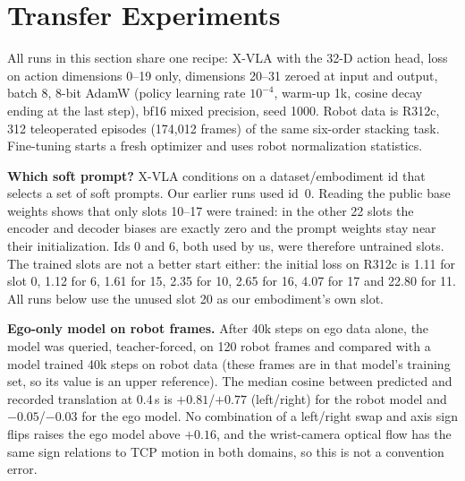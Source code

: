 \documentclass[conference,10pt]{IEEEtran}
\begin{document}
\section{Transfer Experiments}\label{sec:transfer}
All runs in this section share one recipe: X-VLA with the 32-D action head, loss on action dimensions 0--19 only, dimensions
20--31 zeroed at input and output, batch 8, 8-bit AdamW (policy learning rate $10^{-4}$, warm-up 1k, cosine decay ending at the
last step), bf16 mixed precision, seed 1000. Robot data is R312c, 312 teleoperated episodes (174{,}012 frames) of the same
six-order stacking task. Fine-tuning starts a fresh optimizer and uses robot normalization statistics.

\textbf{Which soft prompt?} X-VLA conditions on a dataset/embodiment id that selects a set of soft prompts. Our earlier runs used
id~0. Reading the public base weights shows that only slots 10--17 were trained: in the other 22 slots the encoder and decoder
biases are exactly zero and the prompt weights stay near their initialization. Ids 0 and 6, both used by us, were therefore untrained
slots. The trained slots are not a better start either: the initial loss on R312c is 1.11 for slot 0, 1.12 for 6, 1.61 for 15,
2.35 for 10, 2.65 for 16, 4.07 for 17 and 22.80 for 11. All runs below use the unused slot 20 as our embodiment's own slot.

\textbf{Ego-only model on robot frames.} After 40k steps on ego data alone, the model was queried, teacher-forced, on 120 robot
frames and compared with a model trained 40k steps on robot data (these frames are in that model's training set, so its value
is an upper reference). The median cosine between predicted and recorded translation at 0.4\,s is $+0.81$/$+0.77$ (left/right)
for the robot model and $-0.05$/$-0.03$ for the ego model. No combination of a left/right swap and axis sign flips raises the ego
model above $+0.16$, and the wrist-camera optical flow has the same sign relations to TCP motion in both domains, so this is not
a convention error.
\end{document}
